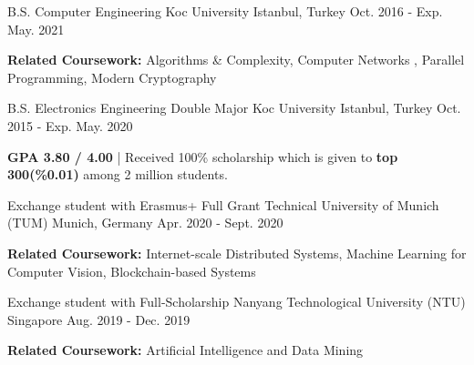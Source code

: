 \begin{cventries}

\cvopenentry
    {B.S. Computer Engineering} %
    {Koc University } %
    {Istanbul, Turkey} %
    {Oct. 2016 - Exp. May. 2021} %
    {\begin{cvitems} %
        \item {\textbf{Related Coursework:} Algorithms \& Complexity, Computer Networks
, Parallel Programming, Modern Cryptography}
      \end{cvitems}
    }
\cvopenentry
    {B.S. Electronics Engineering Double Major} %
    {Koc University } %
    {Istanbul, Turkey} %
    {Oct. 2015 - Exp. May. 2020} %
    {
      \begin{cvitems} %
        \item {\textbf{GPA 3.80 / 4.00} | Received 100\% scholarship which is given to \textbf{top 300(\%0.01)} among 2 million students.}
      \end{cvitems}
    }
\cvopenentry
    {Exchange student with Erasmus+ Full Grant }
    {Technical University of Munich (TUM)} %
    {Munich, Germany} %
    {Apr. 2020 - Sept. 2020} %
    {\begin{cvitems} %
        \item {\textbf{Related Coursework:} Internet-scale Distributed Systems, Machine Learning for Computer Vision, Blockchain-based Systems}
      \end{cvitems}
    }
\cvopenentry
    {Exchange student with Full-Scholarship}
    {Nanyang Technological University (NTU)} %
    {Singapore} %
    {Aug. 2019 - Dec. 2019} %
    {\begin{cvitems} %
        \item {\textbf{Related Coursework:} Artificial Intelligence and Data Mining}
      \end{cvitems}
    }
   
\end{cventries}
